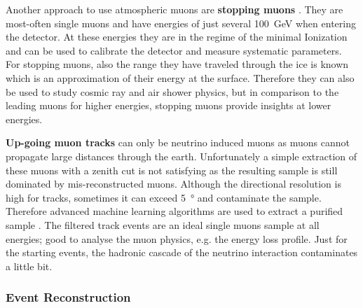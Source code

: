 Another approach to use atmospheric muons are \textbf{stopping muons} \cite{Hoinka17Master}.
They are most-often single muons and have energies of just several \SI{100}{GeV} when entering the detector.
At these energies they are in the regime of the minimal Ionization and can be used to calibrate the detector and measure systematic parameters.
For stopping muons, also the range they have traveled through the ice is known which is an approximation of their energy at the surface.
Therefore they can also be used to study cosmic ray and air shower physics, but in comparison to the leading muons for higher energies, stopping muons provide insights at lower energies.

\textbf{Up-going muon tracks} can only be neutrino induced muons as muons cannot propagate large distances through the earth.
Unfortunately a simple extraction of these muons with a zenith cut is not satisfying as the resulting sample is still dominated by mis-reconstructed muons.
Although the directional resolution is high for tracks, sometimes it can exceed \SI{5}{\degree} and contaminate the sample.
Therefore advanced machine learning algorithms are used to extract a purified sample \cite{Stettner19ICRC}.
The filtered track events are an ideal single muons sample at all energies; good to analyse the muon physics, e.g. the energy loss profile.
Just for the starting events, the hadronic cascade of the neutrino interaction contaminates a little bit.

\subsubsection{Event Reconstruction}

